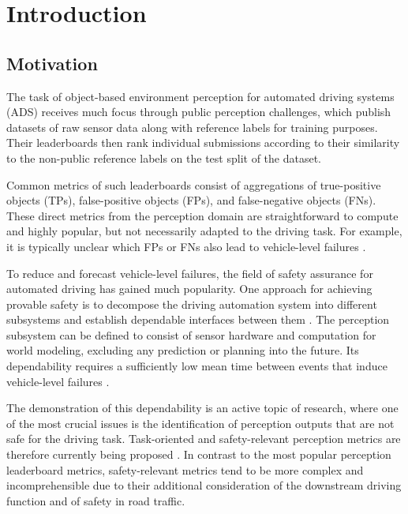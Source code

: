 \documentclass[conference]{IEEEtran}
\begin{document}
\section{Introduction}
\label{sec:introduction}

\subsection{Motivation}

The task of object-based environment perception for automated driving systems (ADS) receives much focus through public perception challenges, %
which publish datasets of raw sensor data along with reference labels for training purposes. 
Their leaderboards then rank individual submissions according to their similarity to the non-public reference labels on the test split of the dataset.

Common metrics of such leaderboards consist of aggregations of true-positive objects (TPs), false-positive objects (FPs), and false-negative objects (FNs). 
These direct metrics from the perception domain are straightforward to compute and highly popular, but not necessarily adapted to the driving task. 
For example, it is typically unclear which FPs or FNs also lead to vehicle-level failures \cite{Oboril2022mtbf_ieee}. 

To reduce and forecast vehicle-level failures, the field of safety assurance for automated driving has gained much popularity. 
One approach for achieving provable safety is to decompose the driving automation system into different subsystems and establish dependable interfaces between them \cite{amersbach2017functional}. 
The perception subsystem can be defined to consist of sensor hardware and computation for world modeling, excluding any prediction or planning into the future. 
Its dependability requires a sufficiently low mean time between events that induce vehicle-level failures \cite{Oboril2022mtbf_ieee}. 


The demonstration of this dependability is an active topic of research, where one of the most crucial issues is the identification of perception outputs that are not safe for the driving task. 
Task-oriented and safety-relevant perception metrics are therefore currently being proposed  \cite{Madala2023metrics,  Lyssenko2022safety, Hoss2023rollingreview}. 
In contrast to the most popular perception leaderboard metrics, safety-relevant metrics tend to be more complex and incomprehensible due to their additional consideration of the downstream driving function and of safety in road traffic. 
\end{document}
